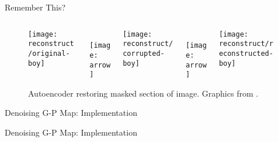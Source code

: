 \begin{frame}{Remember This?}
  \vspace{2ex}
  \begin{figure}
  \begin{columns}
  \begin{column}{0.3\textwidth}
  \texttt{[image: reconstruct/original-boy]}
  \end{column}
  \begin{column}{0.05\textwidth}
  \centering
  \\
  \texttt{[image: arrow]}
  \end{column}
  \begin{column}{0.3\textwidth}
  \texttt{[image: reconstruct/corrupted-boy]}
  \end{column}
  \begin{column}{0.05\textwidth}
  \centering
  \\
  \texttt{[image: arrow]}
  \end{column}
  \begin{column}{0.3\textwidth}
  \texttt{[image: reconstruct/reconstructed-boy]}
  \end{column}
  \end{columns}
  \vspace{1ex}
  \caption{
  Autoencoder restoring masked section of image.
  Graphics from \cite{white2016sampling}.
  }
  \end{figure}

\end{frame}

\begin{frame}{Denoising G-P Map: Implementation}



\end{frame}

\begin{frame}{Denoising G-P Map: Implementation}



\end{frame}

